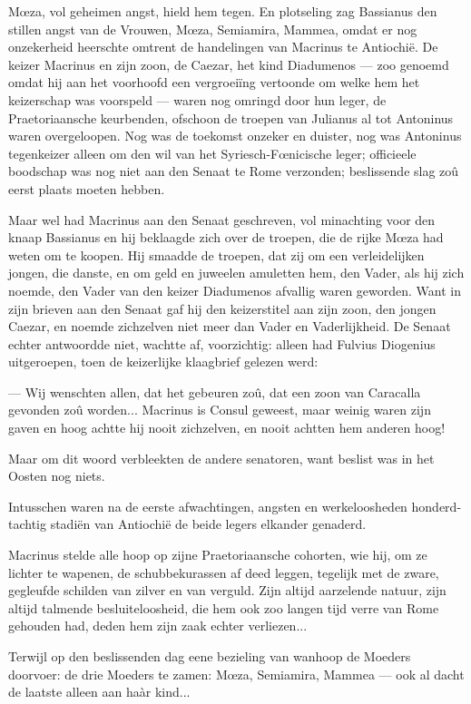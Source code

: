 \documentclass[a4paper, 12pt, oneside, dutch]{article}
\begin{document}
Mœza, vol geheimen angst, hield hem tegen. En plotseling zag Bassianus den stillen angst van de Vrouwen, Mœza, Semiamira, Mammea, omdat er nog onzekerheid heerschte omtrent de handelingen van Macrinus te Antiochië. De keizer Macrinus en zijn zoon, de Caezar, het kind Diadumenos --- zoo genoemd omdat hij aan het voorhoofd een vergroeiïng vertoonde om welke hem het keizerschap was voorspeld --- waren nog omringd door hun leger, de Praetoriaansche keurbenden, ofschoon de troepen van Julianus al tot Antoninus waren overgeloopen. Nog was de toekomst onzeker en duister, nog was Antoninus tegenkeizer alleen om den wil van het Syriesch-Fœnicische leger; officieele boodschap was nog niet aan den Senaat te Rome verzonden; beslissende slag zoû eerst plaats moeten hebben.

Maar wel had Macrinus aan den Senaat geschreven, vol minachting voor den knaap Bassianus en hij beklaagde zich over de troepen, die de rijke Mœza had weten om te koopen. Hij smaadde de troepen, dat zij om een verleidelijken jongen, die danste, en om geld en juweelen amuletten hem, den Vader, als hij zich noemde, den Vader van den keizer Diadumenos afvallig waren geworden. Want in zijn brieven aan den Senaat gaf hij den keizerstitel aan zijn zoon, den jongen Caezar, en noemde zichzelven niet meer dan Vader en Vaderlijkheid. De Senaat echter antwoordde niet, wachtte af, voorzichtig: alleen had Fulvius Diogenius uitgeroepen, toen de keizerlijke klaagbrief gelezen werd:

--- Wij wenschten allen, dat het gebeuren zoû, dat een zoon van Caracalla gevonden zoû worden... Macrinus is Consul geweest, maar weinig waren zijn gaven en hoog achtte hij nooit zichzelven, en nooit achtten hem anderen hoog!

Maar om dit woord verbleekten de andere senatoren, want beslist was in het Oosten nog niets.

Intusschen waren na de eerste afwachtingen, angsten en werkeloosheden honderd-tachtig stadiën van Antiochië de beide legers elkander genaderd.

Macrinus stelde alle hoop op zijne Praetoriaansche cohorten, wie hij, om ze lichter te wapenen, de schubbekurassen af deed leggen, tegelijk met de zware, gegleufde schilden van zilver en van verguld. Zijn altijd aarzelende natuur, zijn altijd talmende besluiteloosheid, die hem ook zoo langen tijd verre van Rome gehouden had, deden hem zijn zaak echter verliezen...

Terwijl op den beslissenden dag eene bezieling van wanhoop de Moeders doorvoer: de drie Moeders te zamen: Mœza, Semiamira, Mammea --- ook al dacht de laatste alleen aan haàr kind...
\end{document}

